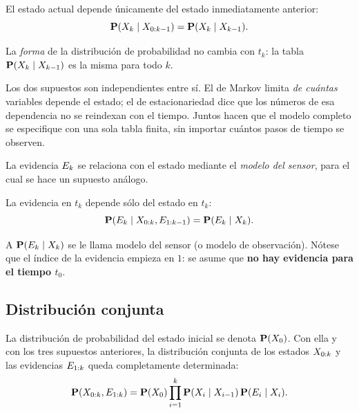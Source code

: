 \begin{supuesto}
  \label{sup:markov}
  El estado actual depende \'unicamente del estado inmediatamente anterior:
  \begin{equation}
    \label{eq:supuesto_markov}
    \mathbf{P}(X_{k}\mid X_{0:k-1}) = \mathbf{P}(X_{k}\mid X_{k-1}).
  \end{equation}
\end{supuesto}

\begin{supuesto}
  \label{sup:estacionario}
  La \emph{forma} de la distribuci\'on de probabilidad no cambia con $t_k$:
  la tabla $\mathbf{P}(X_{k}\mid X_{k-1})$ es la misma para todo $k$.
\end{supuesto}

\begin{observacion}
  Los dos supuestos son independientes entre s\'i. El de Markov limita
  \emph{de cu\'antas} variables depende el estado; el de estacionariedad dice
  que los n\'umeros de esa dependencia no se reindexan con el tiempo. Juntos
  hacen que el modelo completo se especifique con una sola tabla finita,
  sin importar cu\'antos pasos de tiempo se observen.
\end{observacion}

La evidencia $E_{k}$ se relaciona con el estado mediante el
\emph{modelo del sensor}, para el cual se hace un supuesto an\'alogo.

\begin{supuesto}
  \label{sup:markov_sensor}
  La evidencia en $t_k$ depende s\'olo del estado en $t_k$:
  \begin{equation}
    \label{eq:supuesto_sensor}
    \mathbf{P}(E_{k}\mid X_{0:k},E_{1:k-1}) = \mathbf{P}(E_{k}\mid X_{k}).
  \end{equation}
\end{supuesto}

A $\mathbf{P}(E_{k}\mid X_{k})$ se le llama modelo del sensor (o modelo de
observaci\'on). N\'otese que el \'indice de la evidencia empieza en $1$: se
asume que \textbf{no hay evidencia para el tiempo $t_0$}.

\subsection{Distribuci\'on conjunta}
\label{subsec:distribucion_conjunta}

La distribuci\'on de probabilidad del estado inicial se denota
$\mathbf{P}(X_{0})$. Con ella y con los tres supuestos anteriores, la
distribuci\'on conjunta de los estados $X_{0:k}$ y las evidencias
$E_{1:k}$ queda completamente determinada:
\begin{equation}
  \label{eq:conjunta}
  \mathbf{P}(X_{0:k},E_{1:k})
  = \mathbf{P}(X_{0})\prod_{i=1}^{k}
    \mathbf{P}(X_{i}\mid X_{i-1})\,\mathbf{P}(E_{i}\mid X_{i}).
\end{equation}

